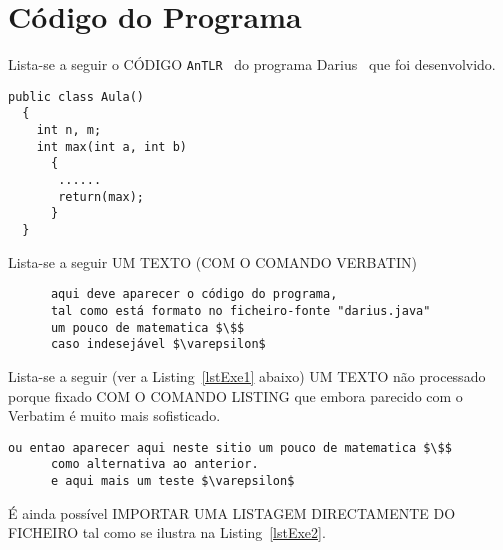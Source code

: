 \documentclass[12pt,a4paper]{report}%
\def\darius{\textsf{Darius}\xspace}
\def\antlr{\texttt{AnTLR}\xspace}
\begin{document}
\appendix %
\chapter{Código do Programa}

Lista-se a seguir o CÓDIGO \antlr~\cite{antlr:2016} do programa
\darius~\cite{maskin:1985} que foi desenvolvido.
\begin{verbatim}
public class Aula()
  {
    int n, m;
    int max(int a, int b)
      {
       ......
       return(max);
      }
  }
\end{verbatim}

Lista-se a seguir UM TEXTO (COM O COMANDO VERBATIN)
\begin{verbatim}
      aqui deve aparecer o código do programa,
      tal como está formato no ficheiro-fonte "darius.java"
      um pouco de matematica $\$$
      caso indesejável $\varepsilon$
\end{verbatim}


Lista-se a seguir (ver a Listing~\ref{lstExe1} abaixo) UM TEXTO não processado porque fixado COM O COMANDO LISTING
que embora parecido com o Verbatim é muito mais sofisticado.

\begin{lstlisting}[caption={Exemplo de uma Listagem}, label={lstExe1}]
      ou entao aparecer aqui neste sitio um pouco de matematica $\$$
      como alternativa ao anterior.
      e aqui mais um teste $\varepsilon$
\end{lstlisting}

\newpage


É ainda possível IMPORTAR UMA LISTAGEM DIRECTAMENTE DO FICHEIRO tal como se ilustra na Listing~\ref{lstExe2}.




\end{document}
